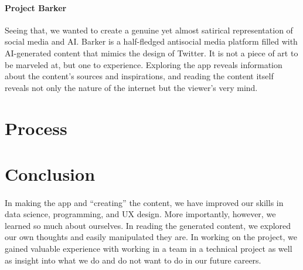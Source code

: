 \documentclass[12pt, letterpaper]{article}
\begin{document}
\paragraph{Project Barker}Seeing that, we wanted to create a genuine yet almost satirical representation of social media and AI. Barker is a half-fledged antisocial media platform filled with AI-generated content that mimics the design of Twitter. It is not a piece of art to be marveled at, but one to experience. Exploring the app reveals information about the content’s sources and inspirations, and reading the content itself reveals not only the nature of the internet but the viewer’s very mind.

\section{Process}

\section{Conclusion}

\paragraph{}In making the app and “creating” the content, we have improved our skills in data science, programming, and UX design. More importantly, however, we learned so much about ourselves. In reading the generated content, we explored our own thoughts and easily manipulated they are. In working on the project, we gained valuable experience with working in a team in a technical project as well as insight into what we do and do not want to do in our future careers.
\end{document}
